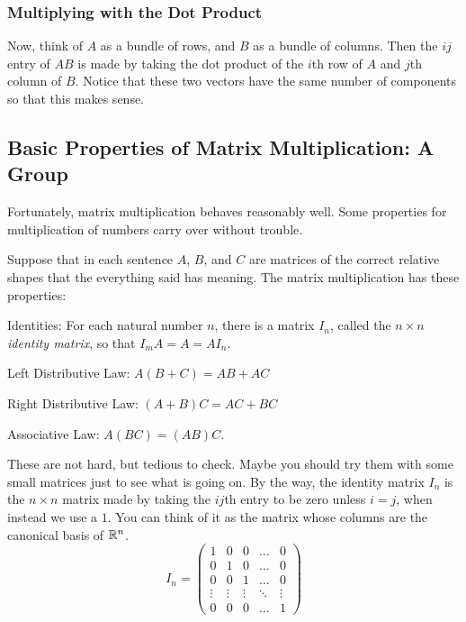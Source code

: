\documentclass[elementsmain.tex]{subfiles}
\begin{document}
\subsubsection*{Multiplying with the Dot Product}

Now, think of $A$ as a bundle of rows, and $B$ as a bundle of columns. Then the $ij$ entry of $AB$ is made by taking the dot product of the $i$th row of $A$ and $j$th column of $B$. Notice that these two vectors have the same number of components so that this makes sense.



\subsection*{Basic Properties of Matrix Multiplication: A Group}

Fortunately, matrix multiplication behaves reasonably well. Some properties for multiplication of numbers carry over without trouble. 

\begin{theorem} Suppose that in each sentence $A$, $B$, and $C$ are matrices of the correct relative shapes that the everything said has meaning. The matrix multiplication has these properties:
\begin{compactdesc}
\item[Identities:] For each natural number $n$, there is a matrix $I_n$, called the \emph{$n\times n$ identity matrix}, so that $I_m A = A = A I_n$.
\item[Left Distributive Law:] $A(B+C) = AB + AC$
\item[Right Distributive Law:] $(A+B)C = AC + BC$
\item[Associative Law:] $A(BC) = (AB)C$.
\end{compactdesc}
\end{theorem}

These are not hard, but tedious to check. Maybe you should try them with some small matrices just to see what is going on. By the way, the identity matrix $I_n$ is the $n\times n$ matrix made by taking the $ij$th entry to be zero unless $i=j$, when instead we use a $1$. You can think of it as the matrix whose columns are the canonical basis of $\mathbb{R}^n$.
\[
I_n = \begin{pmatrix} 1 & 0 & 0 & \dots & 0 \\ 0 & 1 & 0 & \dots & 0 \\ 0 & 0 & 1 &  \dots & 0 \\ \vdots & \vdots & \vdots & \ddots & \vdots \\ 0 & 0 & 0 & \dots & 1 \end{pmatrix}
\]
\end{document}
